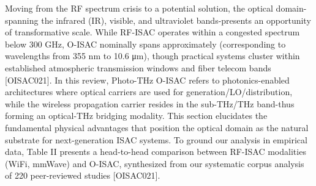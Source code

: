 {}
\markdownRendererSectionEnd \markdownRendererSectionBegin
{}\markdownRendererInterblockSeparator
{}Moving from the RF spectrum crisis to a potential solution, the optical domain-spanning the infrared (IR), visible, and ultraviolet bands-presents an opportunity of transformative scale. While RF-ISAC operates within a congested spectrum below 300 GHz, O-ISAC nominally spans approximately  (corresponding to wavelengths from 355 nm to 10.6 μm), though practical systems cluster within established atmospheric transmission windows and fiber telecom bands [O\markdownRendererUnderscore{}ISAC\markdownRendererUnderscore{}021]. In this review, Photo-THz O-ISAC refers to photonics-enabled architectures where optical carriers are used for generation/LO/distribution, while the wireless propagation carrier resides in the sub-THz/THz band-thus forming an optical-THz bridging modality. This section elucidates the fundamental physical advantages that position the optical domain as the natural substrate for next-generation ISAC systems.\markdownRendererInterblockSeparator
{}\markdownRendererSectionBegin
{}\markdownRendererInterblockSeparator
{}To ground our analysis in empirical data, Table II presents a head-to-head comparison between RF-ISAC modalities (WiFi, mmWave) and O-ISAC, synthesized from our systematic corpus analysis of 220 peer-reviewed studies [O\markdownRendererUnderscore{}ISAC\markdownRendererUnderscore{}021].\markdownRendererParagraphSeparator
{}\markdownRendererInterblockSeparator
{}\markdownRendererInterblockSeparator
